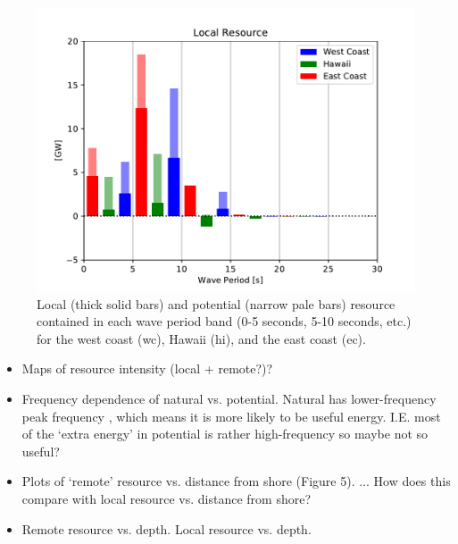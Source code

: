 \begin{figure}[ht]
  \centering
  \includegraphics[width=\linewidth]{../fig/LocalResource_Freq01.pdf}
  \caption{Local (thick solid bars) and potential (narrow pale bars) resource contained in each wave period band (0-5 seconds, 5-10 seconds, etc.) for the west coast (wc), Hawaii (hi), and the east coast (ec).}
  \label{fig:remote-freq}
\end{figure}

\begin{itemize}
\item Maps of resource intensity (local + remote?)?
\item Frequency dependence of natural vs. potential. Natural has lower-frequency peak frequency , which means it is more likely to be useful energy. I.E. most of the `extra energy' in potential is rather high-frequency so maybe not so useful?
\item Plots of ‘remote’ resource vs. distance from shore (Figure 5). ... How does this compare with local resource vs. distance from shore?
\item Remote resource vs. depth. Local resource vs. depth.
\end{itemize}


